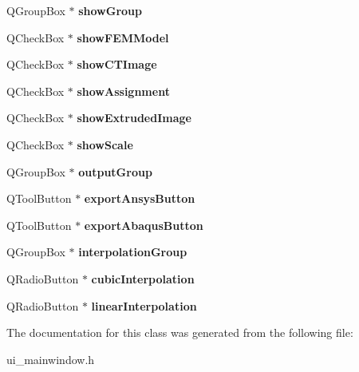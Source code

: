 \begin{DoxyCompactItemize}
\item 
\hypertarget{class_ui___main_window_a3e724a25af379377c12e4858e682ef48}{
QGroupBox $\ast$ {\bfseries showGroup}}
\label{class_ui___main_window_a3e724a25af379377c12e4858e682ef48}

\item 
\hypertarget{class_ui___main_window_a1eddb0a67f132ac15b17f03eb494e5ad}{
QCheckBox $\ast$ {\bfseries showFEMModel}}
\label{class_ui___main_window_a1eddb0a67f132ac15b17f03eb494e5ad}

\item 
\hypertarget{class_ui___main_window_a32097dd72b6565b7b4b04c5d46963551}{
QCheckBox $\ast$ {\bfseries showCTImage}}
\label{class_ui___main_window_a32097dd72b6565b7b4b04c5d46963551}

\item 
\hypertarget{class_ui___main_window_adf8b031acac5840671af80b356b1a027}{
QCheckBox $\ast$ {\bfseries showAssignment}}
\label{class_ui___main_window_adf8b031acac5840671af80b356b1a027}

\item 
\hypertarget{class_ui___main_window_a059ce38ba7542cc2214012edf62b3aa5}{
QCheckBox $\ast$ {\bfseries showExtrudedImage}}
\label{class_ui___main_window_a059ce38ba7542cc2214012edf62b3aa5}

\item 
\hypertarget{class_ui___main_window_ae253e981b223e2092e4a9fd2fe9043f4}{
QCheckBox $\ast$ {\bfseries showScale}}
\label{class_ui___main_window_ae253e981b223e2092e4a9fd2fe9043f4}

\item 
\hypertarget{class_ui___main_window_a38e86835dcd38d073276e93ba2bd3143}{
QGroupBox $\ast$ {\bfseries outputGroup}}
\label{class_ui___main_window_a38e86835dcd38d073276e93ba2bd3143}

\item 
\hypertarget{class_ui___main_window_a40c0496aa762db4ceb44f400db0b15a2}{
QToolButton $\ast$ {\bfseries exportAnsysButton}}
\label{class_ui___main_window_a40c0496aa762db4ceb44f400db0b15a2}

\item 
\hypertarget{class_ui___main_window_ad74e5f4fa57f2aafa1eaa19fa3bac946}{
QToolButton $\ast$ {\bfseries exportAbaqusButton}}
\label{class_ui___main_window_ad74e5f4fa57f2aafa1eaa19fa3bac946}

\item 
\hypertarget{class_ui___main_window_a65fd6e07a25d79ab80391173bb6a099f}{
QGroupBox $\ast$ {\bfseries interpolationGroup}}
\label{class_ui___main_window_a65fd6e07a25d79ab80391173bb6a099f}

\item 
\hypertarget{class_ui___main_window_ac971c780ea97c00235f70f5c751de854}{
QRadioButton $\ast$ {\bfseries cubicInterpolation}}
\label{class_ui___main_window_ac971c780ea97c00235f70f5c751de854}

\item 
\hypertarget{class_ui___main_window_ac9ba2a9ea15494753bc998c7e617f09a}{
QRadioButton $\ast$ {\bfseries linearInterpolation}}
\label{class_ui___main_window_ac9ba2a9ea15494753bc998c7e617f09a}

\end{DoxyCompactItemize}


The documentation for this class was generated from the following file:\begin{DoxyCompactItemize}
\item 
ui\_\-mainwindow.h\end{DoxyCompactItemize}

